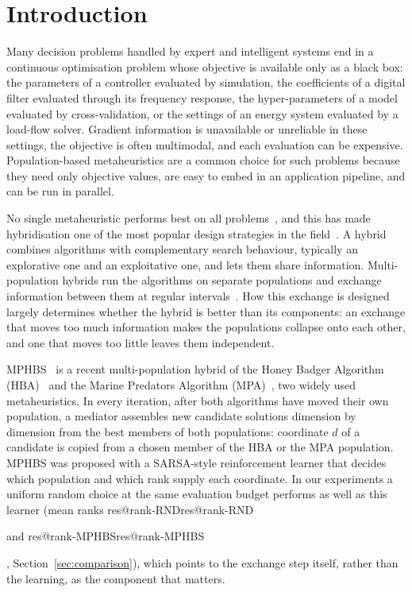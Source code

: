 \documentclass[preprint,12pt,authoryear]{elsarticle}
\makeatletter
\theoremstyle{remark}
\def\res#1{\ifcsname res@#1\endcsname\csname res@#1\endcsname\else\PackageError{res}{Undefined result key #1}{}\fi}
\makeatother
\begin{document}
\section{Introduction}
\label{sec:intro}

Many decision problems handled by expert and intelligent systems end in a continuous optimisation problem whose
objective is available only as a black box: the parameters of a controller evaluated by simulation, the coefficients of
a digital filter evaluated through its frequency response, the hyper-parameters of a model evaluated by
cross-validation, or the settings of an energy system evaluated by a load-flow solver. Gradient information is
unavailable or unreliable in these settings, the objective is often multimodal, and each evaluation can be expensive.
Population-based metaheuristics are a common choice for such problems because they need only objective values, are
easy to embed in an application pipeline, and can be run in parallel.

No single metaheuristic performs best on all problems~\citep{wolpert1997nfl}, and this has made hybridisation one of the
most popular design strategies in the field~\citep{talbi2002taxonomy,blum2011hybrid}. A hybrid combines algorithms with
complementary search behaviour, typically an explorative one and an exploitative one, and lets them share information.
Multi-population hybrids run the algorithms on separate populations and exchange information between them at regular
intervals~\citep{alba2002parallel,ma2019multipop}. How this exchange is designed largely determines whether the hybrid
is better than its components: an exchange that moves too much information makes the populations collapse onto each
other, and one that moves too little leaves them independent.

MPHBS~\citep{flores2026mphbs} is a recent multi-population hybrid of the Honey Badger Algorithm
(HBA)~\citep{hashim2022hba} and the Marine Predators Algorithm (MPA)~\citep{faramarzi2020mpa}, two widely used
metaheuristics. In every iteration, after both algorithms have moved their own population, a mediator assembles new
candidate solutions dimension by dimension from the best members of both populations: coordinate $d$ of a candidate is
copied from a chosen member of the HBA or the MPA population. MPHBS was proposed with a SARSA-style reinforcement
learner that decides which population and which rank supply each coordinate. In our experiments a uniform random
choice at the same evaluation budget performs as well as this learner (mean ranks \res{rank-RND} and
\res{rank-MPHBS}, Section~\ref{sec:comparison}), which points to the exchange step itself, rather than the learning, as
the component that matters.
\end{document}
